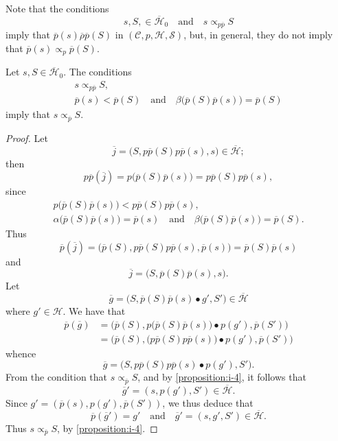 \documentclass[a4paper,fleqn]{article}
\theoremstyle{plain}
\newenvironment{proposition}[1]
  {\renewcommand\theinnerproposition{#1}\innerproposition}
  {\endinnerproposition}
\theoremstyle{definition}
\newcommand{\textand}{\quad\text{and}\quad}
\newcommand{\CC}{\mathcal{C}}
\newcommand{\HH}{\mathcal{H}}
\newcommand{\bHH}{\overline{\HH}}
\renewcommand{\SS}{\mathcal{S}}
\newcommand{\relrhobar}{\mathrel{\overline{\rho}}}
\newcommand{\subs}{\mathrel{\propto}}
\newcommand{\smallbullet}{\bullet}
\begin{document}
Note that the conditions
\[
  s,S,\in\bHH_0
  \textand
  s\subs_{p\overline{p}} S
\]
imply that $\overline{p}(s)\relrhobar\overline{p}(S)$ in $(\CC,p,\HH,\SS)$, but, in general, they do not imply that $\overline{p}(s)\subs_p\overline{p}(S)$.

\begin{proposition}{12}
\label{proposition:i-12}
  Let $s,S\in\bHH_0$.
  The conditions
  \[
    \begin{gathered}
      s\subs_{p\overline{p}}S,
    \\\overline{p}(s)<\overline{p}(S)
      \textand
      \beta\big(\overline{p}(S)\overline{p}(s)\big) = \overline{p}(S)
    \end{gathered}
  \]
  imply that $s\subs_{\overline{p}}S$.
\end{proposition}

\begin{proof}
  Let
  \[
    \overline{j}
    = \big(
      S, p\overline{p}(S)p\overline{p}(s), s
    \big) \in \bHH;
  \]
  then
  \[
    p\overline{p}(\overline{j})
    = p\big(
      \overline{p}(S)\overline{p}(s)
    \big)
    = p\overline{p}(S)p\overline{p}(s),
  \]
  since
  \[
    \begin{gathered}
      p\big(
        \overline{p}(S)\overline{p}(s)
      \big) < p\overline{p}(S)p\overline{p}(s),
    \\\alpha\big(
        \overline{p}(S)\overline{p}(s)
      \big) = \overline{p}(s)
      \textand
      \beta\big(
        \overline{p}(S)\overline{p}(s)
      \big) = \overline{p}(S).
    \end{gathered}
  \]
  Thus
  \[
    \overline{p}(\overline{j})
    = \big(
      \overline{p}(S), p\overline{p}(S)p\overline{p}(s), \overline{p}(s)
    \big)
    = \overline{p}(S)\overline{p}(s)
  \]
  and
  \[
    \overline{j}
    =\big(
      S, \overline{p}(S)\overline{p}(s), s
    \big).
  \]
  Let
  \[
    \overline{g}
    = \big(
      S, \overline{p}(S)\overline{p}(s)\smallbullet g', S'
    \big) \in\bHH
  \]
  where $g'\in\HH$.
  We have that
  \[
    \begin{aligned}
      \overline{p}(\overline{g})
      &= \big(
        \overline{p}(S),
        p\big(\overline{p}(S)\overline{p}(s)\big)\smallbullet p(g'),
        \overline{p}(S')
      \big)
    \\&= \big(
        \overline{p}(S),
        \big(p\overline{p}(S)p\overline{p}(s)\big)\smallbullet p(g'),
        \overline{p}(S')
      \big)
    \end{aligned}
  \]
  whence
  \[
    \overline{g}
    = \big(
      S, p\overline{p}(S)p\overline{p}(s)\smallbullet p(g'), S'
    \big).
  \]
  From the condition that $s\subs_{\overline{p}}S$, and by \cref{proposition:i-4}, it follows that
  \[
    \overline{g}'
    = (s, p(g'), S')
    \in\bHH.
  \]
  Since $g'=(\overline{p}(s),p(g'),\overline{p}(S'))$, we thus deduce that
  \[
    \overline{p}(\overline{g}') = g'
    \textand
    \overline{g}' = (s,g',S') \in \bHH.
  \]
  Thus $s\subs_{\overline{p}}S$, by \cref{proposition:i-4}.
\end{proof}
\end{document}
